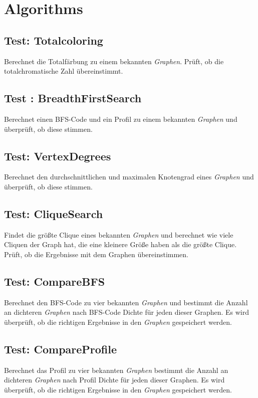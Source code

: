 \documentclass[13pt]{scrreprt}
\begin{document}
\section{Algorithms}

\subsection{Test: Totalcoloring}
Berechnet die Totalfärbung zu einem bekannten \textit{Graphen}. Prüft, ob die totalchromatische Zahl übereinstimmt.

\subsection{Test : BreadthFirstSearch}
Berechnet einen BFS-Code und ein Profil zu einem bekannten \textit{Graphen} und überprüft, ob diese stimmen.

\subsection{Test: VertexDegrees}
Berechnet den durchschnittlichen und maximalen Knotengrad eines \textit{Graphen} und überprüft, ob diese stimmen.

\subsection{Test: CliqueSearch}
Findet die größte Clique eines bekannten \textit{Graphen} und berechnet wie viele Cliquen der Graph hat, die eine kleinere Größe haben als die größte Clique. Prüft, ob die Ergebnisse mit dem Graphen übereinstimmen.

\subsection{Test: CompareBFS}
Berechnet den BFS-Code zu vier bekannten \textit{Graphen} und bestimmt die Anzahl an dichteren \textit{Graphen} nach BFS-Code Dichte für jeden dieser Graphen. Es wird überprüft, ob die richtigen Ergebnisse in den \textit{Graphen} gespeichert werden.

\subsection{Test: CompareProfile}
Berechnet das Profil zu vier bekannten \textit{Graphen} bestimmt die Anzahl an dichteren \textit{Graphen} nach Profil Dichte für jeden dieser Graphen. Es wird überprüft, ob die richtigen Ergebnisse in den \textit{Graphen} gespeichert werden. 
\end{document}
